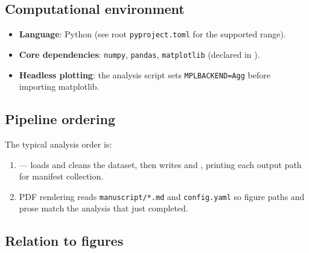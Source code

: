 \documentclass[
]{article}
\providecommand{\tightlist}{%
  \setlength{\itemsep}{0pt}\setlength{\parskip}{0pt}}
\begin{document}
\subsection{Computational environment}\label{computational-environment}

\begin{itemize}
\tightlist
\item
  \textbf{Language}: Python (see root \texttt{pyproject.toml} for the
  supported range).
\item
  \textbf{Core dependencies}: \texttt{numpy}, \texttt{pandas},
  \texttt{matplotlib} (declared in
  ).
\item
  \textbf{Headless plotting}: the analysis script sets
  \texttt{MPLBACKEND=Agg} before importing matplotlib.
\end{itemize}

\subsection{Pipeline ordering}\label{pipeline-ordering}

The typical analysis order is:

\begin{enumerate}
\def\labelenumi{\arabic{enumi}.}
\tightlist
\item
   --- loads and cleans the dataset,
  then writes  and
  , printing each output
  path for manifest collection.
\item
  PDF rendering reads \texttt{manuscript/*.md} and \texttt{config.yaml}
  so figure paths and prose match the analysis that just completed.
\end{enumerate}

\subsection{Relation to figures}\label{relation-to-figures}
\end{document}
